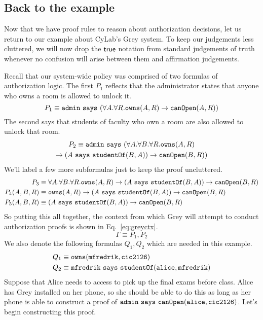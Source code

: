 \documentclass[11pt,twoside]{scrartcl}
\begin{document}
\subsection{Back to the example}

Now that we have proof rules to reason about authorization decisions, let us return to our example about CyLab's Grey system. To keep our judgements less cluttered, we will now drop the $\mathsf{true}$ notation from standard judgements of truth whenever no confusion will arise between them and affirmation judgements.

Recall that our system-wide policy was comprised of two formulas of authorization logic. The first $P_1$ reflects that the administrator states that anyone who owns a room is allowed to unlock it.
\[
P_1 \equiv \mathtt{admin}~\texttt{\upshape says}~(\forall A.\forall R. \texttt{\upshape owns}(A,R) \rightarrow \texttt{\upshape canOpen}(A,R))
\]
The second says that students of faculty who own a room are also allowed to unlock that room.
\begin{multline*}
P_2 \equiv \mathtt{admin}~\texttt{\upshape says}~(\forall A.\forall B.\forall R. \texttt{\upshape owns}(A,R) \\ \rightarrow (A~\texttt{\upshape says}~\texttt{\upshape studentOf}(B,A)) \rightarrow \texttt{\upshape canOpen}(B,R))
\end{multline*}
We'll label a few more subformulas just to keep the proof uncluttered.
\begin{align*}
P_3 &\equiv \forall A.\forall B.\forall R. \texttt{\upshape owns}(A,R) \rightarrow (A~\texttt{\upshape says}~\texttt{\upshape studentOf}(B,A)) \rightarrow \texttt{\upshape canOpen}(B,R) \\
P_4(A,B,R) &\equiv \texttt{\upshape owns}(A,R) \rightarrow (A~\texttt{\upshape says}~\texttt{\upshape studentOf}(B,A)) \rightarrow \texttt{\upshape canOpen}(B,R) \\
P_5(A,B,R) &\equiv (A~\texttt{\upshape says}~\texttt{\upshape studentOf}(B,A)) \rightarrow \texttt{\upshape canOpen}(B,R)
\end{align*}
So putting this all together, the context from which Grey will attempt to conduct authorization proofs is shown in Eq.~\ref{eq:greyctx}.
\begin{equation}
\label{eq:greyctx}
\Gamma \equiv P_1,P_2
\end{equation}
We also denote the following formulas $Q_1, Q_2$ which are needed in this example.
\begin{align*}
Q_1 &\equiv \texttt{\upshape owns}(\texttt{\upshape mfredrik},\texttt{\upshape cic2126}) \\
Q_2 &\equiv \texttt{\upshape mfredrik}~\texttt{\upshape says}~\texttt{\upshape studentOf}(\texttt{\upshape alice},\texttt{\upshape mfredrik})
\end{align*}
Suppose that Alice needs to access \office to pick up the final exams before class. Alice has Grey installed on her phone, so she should be able to do this as long as her phone is able to construct a proof of $\texttt{\upshape admin}~\texttt{\upshape says}~\texttt{\upshape canOpen}(\texttt{\upshape alice},\texttt{\upshape cic2126})$. Let's begin constructing this proof. 
\end{document}
